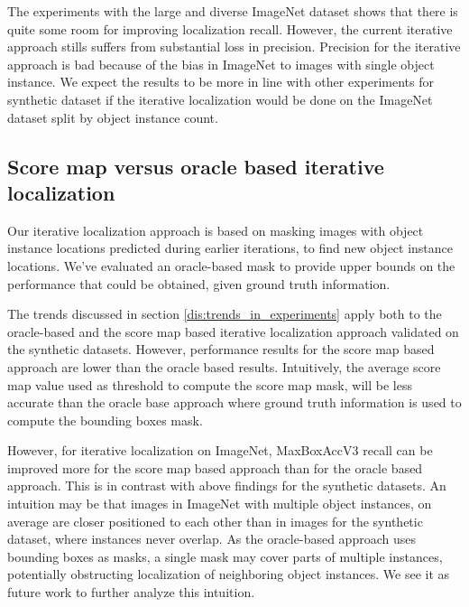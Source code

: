 The experiments with the large and diverse ImageNet dataset shows that there is quite some room for improving localization recall. However, the current iterative approach stills suffers from substantial loss in precision. Precision for the iterative approach is bad because of the bias in ImageNet to images with single object instance. We expect the results to be more in line with other experiments for synthetic dataset if the iterative localization would be done on the ImageNet dataset split by object instance count.

\subsection{Score map versus oracle based iterative localization}
Our iterative localization approach is based on masking images with object instance locations predicted during earlier iterations, to find new object instance locations. We've evaluated an oracle-based mask to provide upper bounds on the performance that could be obtained, given ground truth information. 

The trends discussed in section \ref{dis:trends_in_experiments} apply both to the oracle-based and the score map based iterative localization approach validated on the synthetic datasets. However, performance results for the score map based approach are lower than the oracle based results. Intuitively, the average score map value used as threshold to compute the score map mask, will be less accurate than the oracle base  approach where ground truth information is used to compute the bounding boxes mask. 

However, for iterative localization on ImageNet, MaxBoxAccV3 recall can be improved more for the score map based approach than for the oracle based approach. This is in contrast with above findings for the synthetic datasets. An intuition may be that images in ImageNet with multiple object instances, on average are closer positioned to each other than in images for the synthetic dataset, where instances never overlap. As the oracle-based approach uses bounding boxes as masks, a single mask may cover parts of multiple instances, potentially obstructing localization of neighboring object instances. We see it as future work to further analyze this intuition.

